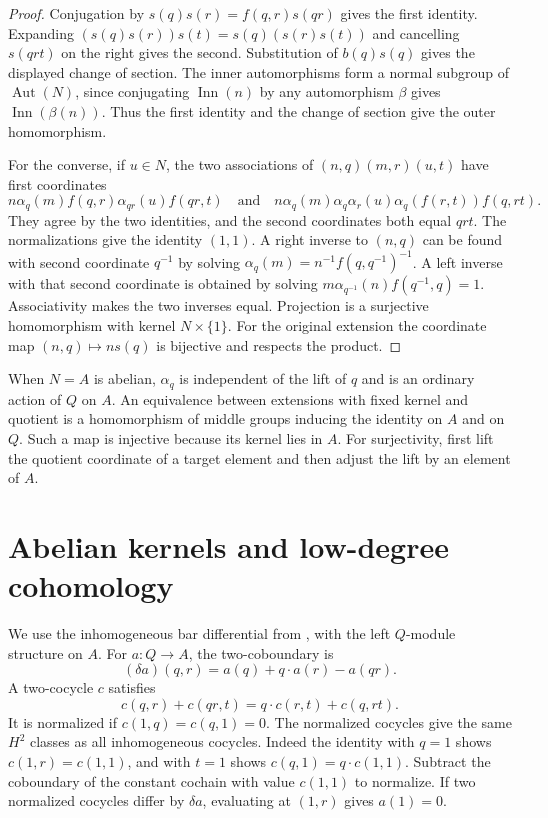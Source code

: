 \begin{proof}
Conjugation by \(s(q)s(r)=f(q,r)s(qr)\) gives the first identity.
Expanding \((s(q)s(r))s(t)=s(q)(s(r)s(t))\) and cancelling \(s(qrt)\)
on the right gives the second. Substitution of \(b(q)s(q)\) gives
the displayed change of section. The inner automorphisms form a
normal subgroup of \(\operatorname{Aut}(N)\), since conjugating
\(\operatorname{Inn}(n)\) by any automorphism \(\beta\) gives
\(\operatorname{Inn}(\beta(n))\). Thus the first identity and the
change of section give the outer homomorphism.

For the converse, if \(u\in N\), the two associations of
\((n,q)(m,r)(u,t)\) have first coordinates
\[
 n\alpha_q(m) f(q,r)\alpha_{qr}(u) f(qr,t)
 \quad\text{and}\quad
 n\alpha_q(m)\alpha_q\alpha_r(u)\alpha_q(f(r,t))f(q,rt).
\]
They agree by the two identities, and the second coordinates both
equal \(qrt\). The normalizations give the identity \((1,1)\).
A right inverse to \((n,q)\) can be found with second coordinate
\(q^{-1}\) by solving \(\alpha_q(m)=n^{-1}f(q,q^{-1})^{-1}\).
A left inverse with that second coordinate is obtained by solving
\(m\alpha_{q^{-1}}(n)f(q^{-1},q)=1\).
Associativity makes the two inverses equal. Projection is a
surjective homomorphism with kernel \(N\times\{1\}\).
For the original extension the coordinate map
\((n,q)\mapsto ns(q)\) is bijective and respects the product.
\end{proof}

When \(N=A\) is abelian, \(\alpha_q\) is independent of the lift of
\(q\) and is an ordinary action of \(Q\) on \(A\). An equivalence
between extensions with fixed kernel and quotient is a homomorphism
of middle groups inducing the identity on \(A\) and on \(Q\).
Such a map is injective because its kernel lies in \(A\). For
surjectivity, first lift the quotient coordinate of a target
element and then adjust the lift by an element of \(A\).

\section{Abelian kernels and low-degree cohomology}

We use the inhomogeneous bar differential from
\cite[A02 and A03]{homalg}, with the left \(Q\)-module structure on
\(A\). For \(a:Q\to A\), the two-coboundary is
\[
 (\delta a)(q,r)=a(q)+q\cdot a(r)-a(qr).
\]
A two-cocycle \(c\) satisfies
\[
 c(q,r)+c(qr,t)=q\cdot c(r,t)+c(q,rt).
\]
It is normalized if \(c(1,q)=c(q,1)=0\). The normalized
cocycles give the same \(H^2\) classes as all inhomogeneous
cocycles. Indeed the identity with \(q=1\) shows
\(c(1,r)=c(1,1)\), and with \(t=1\) shows \(c(q,1)=q\cdot c(1,1)\).
Subtract the coboundary of the constant cochain with value
\(c(1,1)\) to normalize. If two normalized cocycles differ by
\(\delta a\), evaluating at \((1,r)\) gives \(a(1)=0\).

